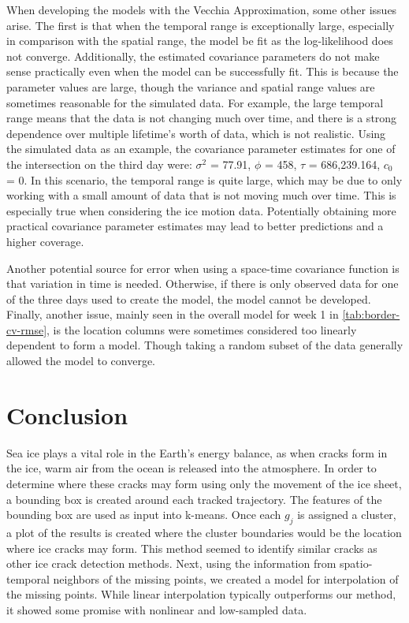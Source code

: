 \documentclass[12pt]{article}
\begin{document}
When developing the models with the Vecchia Approximation, some other
issues arise. The first is that when the temporal range is exceptionally
large, especially in comparison with the spatial range, the model be fit
as the log-likelihood does not converge. Additionally, the estimated
covariance parameters do not make sense practically even when the model
can be successfully fit. This is because the parameter values are large,
though the variance and spatial range values are sometimes reasonable
for the simulated data. For example, the large temporal range means that
the data is not changing much over time, and there is a strong
dependence over multiple lifetime's worth of data, which is not
realistic. Using the simulated data as an example, the covariance
parameter estimates for one of the intersection on the third day were:
\(\sigma^2\) = 77.91, \(\phi\) = 458, \(\tau\) = 686,239.164, \(c_0\) =
0. In this scenario, the temporal range is quite large, which may be due
to only working with a small amount of data that is not moving much over
time. This is especially true when considering the ice motion data.
Potentially obtaining more practical covariance parameter estimates may
lead to better predictions and a higher coverage.

Another potential source for error when using a space-time covariance
function is that variation in time is needed. Otherwise, if there is
only observed data for one of the three days used to create the model,
the model cannot be developed. Finally, another issue, mainly seen in
the overall model for week 1 in \cref{tab:border-cv-rmse}, is the
location columns were sometimes considered too linearly dependent to
form a model. Though taking a random subset of the data generally
allowed the model to converge.

\hypertarget{conclusion}{%
\section{Conclusion}\label{conclusion}}

Sea ice plays a vital role in the Earth's energy balance, as when cracks
form in the ice, warm air from the ocean is released into the
atmosphere. In order to determine where these cracks may form using only
the movement of the ice sheet, a bounding box is created around each
tracked trajectory. The features of the bounding box are used as input
into k-means. Once each \(g_j\) is assigned a cluster, a plot of the
results is created where the cluster boundaries would be the location
where ice cracks may form. This method seemed to identify similar cracks
as other ice crack detection methods. Next, using the information from
spatio-temporal neighbors of the missing points, we created a model for
interpolation of the missing points. While linear interpolation
typically outperforms our method, it showed some promise with nonlinear
and low-sampled data.
\end{document}
